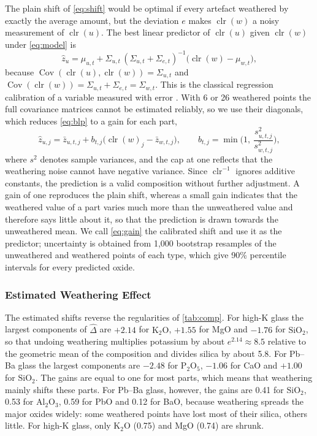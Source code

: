 \documentclass[11pt,a4paper]{article}
\newcommand{\clr}{\operatorname{clr}}
\newcommand{\ox}[1]{\ensuremath{\mathrm{#1}}}
\begin{document}
The plain shift of \cref{eq:shift} would be optimal if every artefact weathered by exactly the average amount, but the deviation $e$ makes $\clr(w)$ a noisy measurement of $\clr(u)$.
The best linear predictor of $\clr(u)$ given $\clr(w)$ under \cref{eq:model} is
\begin{equation}\label{eq:blp}
\hat z_u = \mu_{u,t} + \Sigma_{u,t}\,(\Sigma_{u,t}+\Sigma_{e,t})^{-1}\big(\clr(w)-\mu_{w,t}\big),
\end{equation}
because $\operatorname{Cov}(\clr(u),\clr(w))=\Sigma_{u,t}$ and $\operatorname{Cov}(\clr(w))=\Sigma_{u,t}+\Sigma_{e,t}=\Sigma_{w,t}$.
This is the classical regression calibration of a variable measured with error \citep{fuller1987}.
With 6 or 26 weathered points the full covariance matrices cannot be estimated reliably, so we use their diagonals, which reduces \cref{eq:blp} to a gain for each part,
\begin{equation}\label{eq:gain}
\hat z_{u,j} = \bar z_{u,t,j} + b_{t,j}\big(\clr(w)_j - \bar z_{w,t,j}\big), \qquad b_{t,j}=\min\!\Big(1,\ \frac{s^2_{u,t,j}}{s^2_{w,t,j}}\Big),
\end{equation}
where $s^2$ denotes sample variances, and the cap at one reflects that the weathering noise cannot have negative variance.
Since $\clr^{-1}$ ignores additive constants, the prediction is a valid composition without further adjustment.
A gain of one reproduces the plain shift, whereas a small gain indicates that the weathered value of a part varies much more than the unweathered value and therefore says little about it, so that the prediction is drawn towards the unweathered mean.
We call \cref{eq:gain} the calibrated shift and use it as the predictor; uncertainty is obtained from 1{,}000 bootstrap resamples of the unweathered and weathered points of each type, which give 90\% percentile intervals for every predicted oxide.

\subsubsection{Estimated Weathering Effect}
The estimated shifts reverse the regularities of \cref{tab:comp}.
For high-K glass the largest components of $\hat\Delta$ are $+2.14$ for \ox{K_2O}, $+1.55$ for MgO and $-1.76$ for \ox{SiO_2}, so that undoing weathering multiplies potassium by about $e^{2.14}\approx 8.5$ relative to the geometric mean of the composition and divides silica by about 5.8.
For Pb--Ba glass the largest components are $-2.48$ for \ox{P_2O_5}, $-1.06$ for CaO and $+1.00$ for \ox{SiO_2}.
The gains are equal to one for most parts, which means that weathering mainly shifts these parts.
For Pb--Ba glass, however, the gains are 0.41 for \ox{SiO_2}, 0.53 for \ox{Al_2O_3}, 0.59 for PbO and 0.12 for BaO, because weathering spreads the major oxides widely: some weathered points have lost most of their silica, others little.
For high-K glass, only \ox{K_2O} (0.75) and MgO (0.74) are shrunk.
\end{document}
